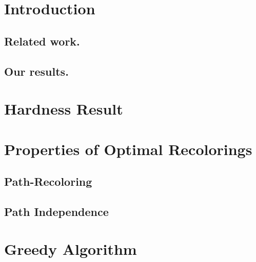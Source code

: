 \section{Introduction}

	\subsection*{Related work.}
	
	\subsection*{Our results.}
	
\section{Hardness Result}


\section{Properties of Optimal Recolorings}

	\subsection{Path-Recoloring}

	\subsection{Path Independence}


\section{Greedy Algorithm}

